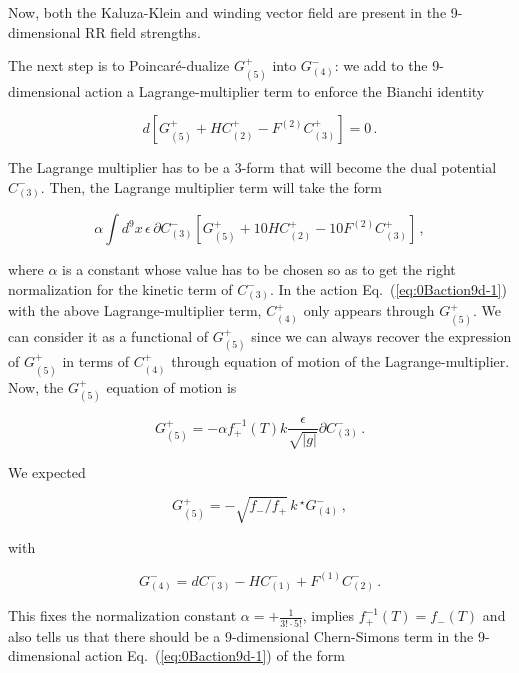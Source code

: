 \documentclass[12pt,a4paper]{article}
\begin{document}
\noindent Now, both the Kaluza-Klein and winding vector field are
present in the 9-dimensional RR field strengths.

The next step is to Poincar\'e-dualize $G^{+}_{(5)}$ into $G^{-}_{(4)}$:
we add to the 9-dimensional action a Lagrange-multiplier term to enforce the 
Bianchi identity

\begin{equation}
d\left[G^{+}_{(5)}+HC^{+}_{(2)}-F^{(2)}C^{+}_{(3)}\right]=0\, .  
\end{equation}

The Lagrange multiplier has to be a 3-form that will become the dual
potential $C^{-}_{(3)}$. Then, the Lagrange multiplier term will take
the form

\begin{equation}
\label{eq:lagragemultiplierterm}
\alpha\int d^{9}x\, \epsilon\, \partial C^{-}_{(3)} 
\left[G^{+}_{(5)}+10HC^{+}_{(2)}-10F^{(2)}C^{+}_{(3)}\right]\, ,
\end{equation}

\noindent where $\alpha$ is a constant whose value has to be chosen 
so as to get the right normalization for the kinetic term of
$C^{-}_{(3)}$. In the action Eq.~(\ref{eq:0Baction9d-1}) with the
above Lagrange-multiplier term, $C^{+}_{(4)}$ only appears through
$G^{+}_{(5)}$. We can consider it as a functional of $G^{+}_{(5)}$
since we can always recover the expression of $G^{+}_{(5)}$ in terms of 
$C^{+}_{(4)}$ through equation of motion of the Lagrange-multiplier.
Now, the $G^{+}_{(5)}$ equation of motion is

\begin{equation}
G^{+}_{(5)}= -\alpha f^{-1}_{+}(T) k\frac{\epsilon}{\sqrt{|g|}} 
\partial C^{-}_{(3)}\, .
\end{equation}

\noindent We expected 

\begin{equation}
\label{eq:expected}
G^{+}_{(5)}=  -\sqrt{f_{-}/f_{+}}\, k\, {}^{\star}G^{-}_{(4)}\, ,
\end{equation}

\noindent with 

\begin{equation}
G^{-}_{(4)} = dC^{-}_{(3)} -HC^{-}_{(1)} +F^{(1)} C^{-}_{(2)}\, .
\end{equation}

\noindent This fixes the normalization constant 
$\alpha=+\frac{1}{3!\cdot5!}$, implies $f^{-1}_{+}(T) =f_{-}(T)$ and
also tells us that there should be a 9-dimensional Chern-Simons term
in the 9-dimensional action Eq.~(\ref{eq:0Baction9d-1}) of the form
\end{document}
